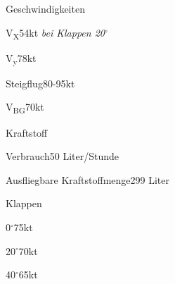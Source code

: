 \begin{memoryitem}
  \begin{checklist}{Geschwindigkeiten}
    \item{V\textsubscript{X}}{54kt \textit{bei Klappen 20$^{\circ}$}}
    \item{V\textsubscript{y}}{78kt}
    \item{Steigflug}{80-95kt}
    \item{V\textsubscript{BG}}{70kt}
  \end{checklist}
  \begin{checklist}{Kraftstoff}
    \item{Verbrauch}{50 Liter/Stunde}
    \item{Ausfliegbare Kraftstoffmenge}{299 Liter}
  \end{checklist}
  \begin{checklist}{Klappen}
    \item{0$^{\circ}$}{75kt}
    \item{20$^{\circ}$}{70kt}
    \item{40$^{\circ}$}{65kt}
  \end{checklist}
\end{memoryitem}
